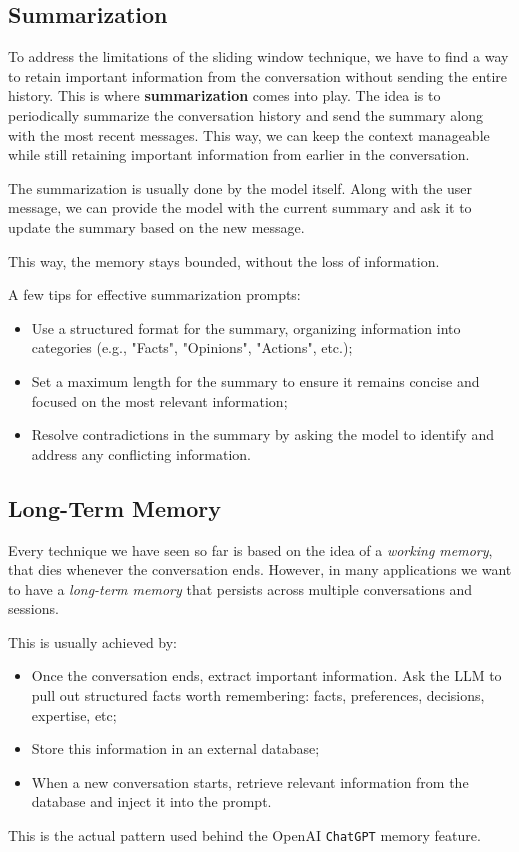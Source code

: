 \subsection{Summarization}
To address the limitations of the sliding window technique, we have to find a way to retain important information from the conversation without sending the entire history.
This is where \textbf{summarization} comes into play.
The idea is to periodically summarize the conversation history and send the summary along with the most recent messages. 
This way, we can keep the context manageable while still retaining important information from earlier in the conversation.

The summarization is usually done by the model itself. Along with the user message,
we can provide the model with the current summary and ask it to update the summary based on the new message.

This way, the memory stays bounded, without the loss of information.

A few tips for effective summarization prompts:
\begin{itemize}
    \item Use a structured format for the summary, organizing information into categories (e.g., "Facts", "Opinions", "Actions", etc.);
    \item Set a maximum length for the summary to ensure it remains concise and focused on the most relevant information;
    \item Resolve contradictions in the summary by asking the model to identify and address any conflicting information.
\end{itemize}

\subsection{Long-Term Memory}
Every technique we have seen so far is based on the idea of a \textit{working memory}, that dies whenever the conversation ends.
However, in many applications we want to have a \textit{long-term memory} that persists across multiple conversations and sessions. 

This is usually achieved by:
\begin{itemize}
    \item Once the conversation ends, extract important information. Ask the LLM to pull out structured facts worth remembering: facts, preferences, decisions, expertise, etc;
    \item Store this information in an external database;
    \item When a new conversation starts, retrieve relevant information from the database and inject it into the prompt.
\end{itemize}
This is the actual pattern used behind the OpenAI \texttt{ChatGPT} memory feature.

